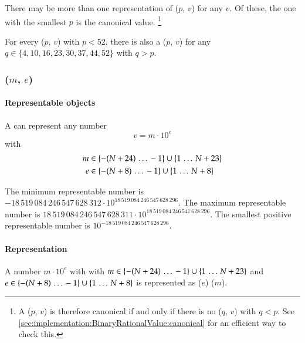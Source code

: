 There may be more than one representation of \DborBinaryRationalValue($p$, $v$) for any $v$.
Of these, the one with the smallest $p$ is the canonical value.%
\footnote{
    A \DborBinaryRationalValue($p$, $v$) is therefore canonical if and only if there is
    no \DborBinaryRationalValue($q$, $v$) with $q < p$.
    See \ref{sec:implementation:BinaryRationalValue:canonical} for an efficient way to check this.
}

For every \DborBinaryRationalValue($p$, $v$) with $p < 52$, there is also
a \DborBinaryRationalValue($p$, $v$) for any
$q \in \{4, 10, 16, 23, 30, 37, 44, 52\}$ with $q > p$.


\subsubsection{\DborDecimalRationalValue(\texorpdfstring{$m$, $e$}{m, e})}
\hypertarget{sec:def:DecimalRationalValue}{}

\paragraph{Representable objects}

A \DborDecimalRationalValue{} can represent any number
\begin{equation}
    v = m \cdot 10^e
\end{equation}
with
\begin{align*}
    m & \in \{-(N + 24) \,\ldots\, -1\} \cup \{1 \,\ldots\, N + 23\} \\
    e & \in \{-(N + 8) \,\ldots\, -1\} \cup \{1 \,\ldots\, N + 8\}
\end{align*}

\smallskip
The minimum representable number is $-18\,519\,084\,246\,547\,628\,312 \cdot 10^{18\,519\,084\,246\,547\,628\,296}$.
The maximum representable number is $18\,519\,084\,246\,547\,628\,311 \cdot 10^{18\,519\,084\,246\,547\,628\,296}$.
The smallest positive representable number is $10^{-18\,519\,084\,246\,547\,628\,296}$.

\paragraph{Representation}

A number $m \cdot 10^e$ with with $m \in \{-(N + 24) \,\ldots\, -1\} \cup \{1 \,\ldots\, N + 23\}$
and $e \in \{-(N + 8) \,\ldots\, -1\} \cup \{1 \,\ldots\, N + 8\}$
is represented as \DborPowerOfTenToken*($e$) {\Concat} \DborIntegerValue*($m$).

